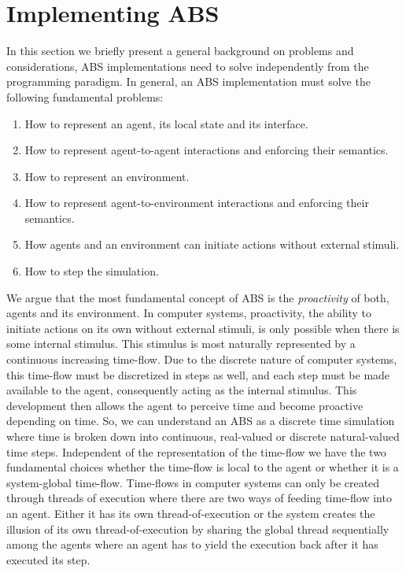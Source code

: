\section{Implementing ABS}
\label{ch:impl_abs}
In this section we briefly present a general background on problems and considerations, ABS implementations need to solve independently from the programming paradigm. In general, an ABS implementation must solve the following fundamental problems:

\begin{enumerate}
	\item How to represent an agent, its local state and its interface.
	\item How to represent agent-to-agent interactions and enforcing their semantics.
	\item How to represent an environment.
	\item How to represent agent-to-environment interactions and enforcing their semantics.
	\item How agents and an environment can initiate actions without external stimuli.
	\item How to step the simulation.
\end{enumerate}

We argue that the most fundamental concept of ABS is the \textit{proactivity} of both, agents and its environment. In computer systems, proactivity, the ability to initiate actions on its own without external stimuli, is only possible when there is some internal stimulus. This stimulus is most naturally represented by a continuous increasing time-flow. Due to the discrete nature of computer systems, this time-flow must be discretized in steps as well, and each step must be made available to the agent, consequently acting as the internal stimulus. This development then allows the agent to perceive time and become proactive depending on time. So, we can understand an ABS as a discrete time simulation where time is broken down into continuous, real-valued or discrete natural-valued time steps. Independent of the representation of the time-flow we have the two fundamental choices whether the time-flow is local to the agent or whether it is a system-global time-flow. Time-flows in computer systems can only be created through threads of execution where there are two ways of feeding time-flow into an agent. Either it has its own thread-of-execution or the system creates the illusion of its own thread-of-execution by sharing the global thread sequentially among the agents where an agent has to yield the execution back after it has executed its step. %

